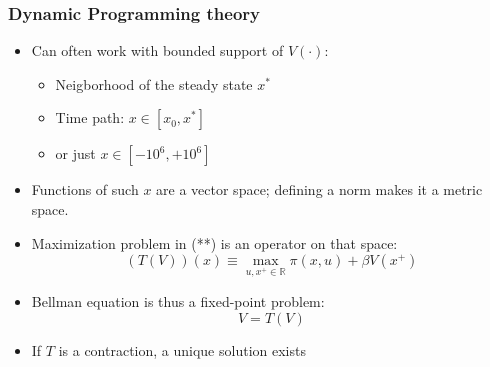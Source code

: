 \documentclass[bigger,handout]{beamer}
\begin{document}
\begin{frame}%

\frametitle{Dynamic Programming theory}

\begin{itemize}
\item Can often work with bounded support of $V\left( \cdot \right) $:

\begin{itemize}
\item Neigborhood of the steady state $x^{\ast }$

\item Time path: $x\in \left[ x_{0},x^{\ast }\right] $

\item or just $x\in \left[ -10^{6},+10^{6}\right] $
\end{itemize}

\item Functions of such $x$ are a vector space; \newline
defining a norm makes it a metric space.

\item Maximization problem in (**) is an operator on that space:%
\begin{equation*}
\left( T\left( V\right) \right) \left( x\right) \equiv \max_{u,x^{+}\in
\mathbb{R}}\pi (x,u)+\beta V(x^{+})
\end{equation*}

\item Bellman equation is thus a fixed-point problem:%
\begin{equation*}
V=T\left( V\right)
\end{equation*}

\item If $T$ is a contraction, a unique solution exists
\end{itemize}



\end{frame}%
\end{document}
